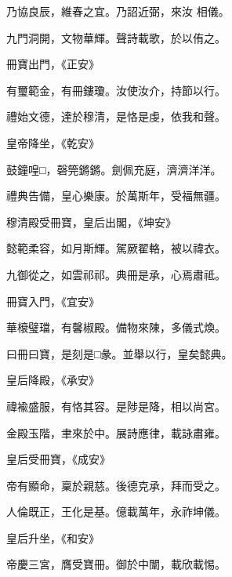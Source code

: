 \begin{pinyinscope}
 乃協良辰，維春之宜。乃詔近弼，來汝
 相儀。



 九門洞開，文物華輝。聲詩載歌，於以侑之。



 冊寶出門，《正安》



 有璽範金，有冊鏤瓊。汝使汝介，持節以行。



 禮始文德，達於穆清，是恪是虔，依我和聲。



 皇帝降坐，《乾安》



 鼓鐘喤□，磬筦鏘鏘。劍佩充庭，濟濟洋洋。



 禮典告備，皇心樂康。於萬斯年，受福無疆。



 穆清殿受冊寶，皇后出閣，《坤安》



 懿範柔容，如月斯輝。駕厥翟輅，被以禕衣。



 九御從之，如雲祁祁。典冊是承，心焉肅祗。



 冊寶入門，《宜安》



 華榱璧璫，有馨椒殿。備物來陳，多儀式煥。



 曰冊曰寶，是刻是□彖。並舉以行，皇矣懿典。



 皇后降殿，《承安》



 禕褕盛服，有恪其容。是陟是降，相以尚宮。



 金殿玉階，聿來於中。展詩應律，載詠肅雍。



 皇后受冊寶，《成安》



 帝有顯命，稟於親慈。後德克承，拜而受之。



 人倫既正，王化是基。億載萬年，永祚坤儀。



 皇后升坐，《和安》



 帝慶三宮，膺受寶冊。御於中闈，載欣載惕。




\end{pinyinscope}
